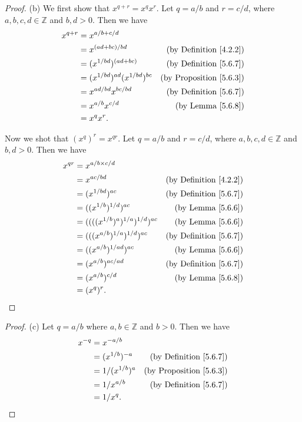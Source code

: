 \begin{proof}{(b)}
We first show that \(x^{q + r} = x^q x^r\).
Let \(q = a / b\) and \(r = c / d\), where \(a, b, c, d \in \mathds{Z}\) and \(b, d > 0\).
Then we have
\begin{align*}
x^{q + r} &= x^{a / b + c / d} \\
&= x^{(ad + bc) / bd} & \text{(by Definition \ref{4.2.2})} \\
&= (x^{1 / bd})^{(ad + bc)} & \text{(by Definition \ref{5.6.7})} \\
&= (x^{1 / bd})^{ad} (x^{1 / bd})^{bc} & \text{(by Proposition \ref{5.6.3})} \\
&= x^{ad / bd} x^{bc / bd} & \text{(by  Definition \ref{5.6.7})} \\
&= x^{a / b} x^{c / d} & \text{(by Lemma \ref{5.6.8})} \\
&= x^q x^r.
\end{align*}

Now we shot that \((x^q)^r = x^{qr}\).
Let \(q = a / b\) and \(r = c / d\), where \(a, b, c, d \in \mathds{Z}\) and \(b, d > 0\).
Then we have
\begin{align*}
x^{qr} &= x^{a / b \times c / d} \\
&= x^{ac / bd} & \text{(by Definition \ref{4.2.2})} \\
&= (x^{1 / bd})^{ac} & \text{(by Definition \ref{5.6.7})} \\
&= ((x^{1 / b})^{1 / d})^{ac} & \text{(by Lemma \ref{5.6.6})} \\
&= ((((x^{1 / b})^a)^{1 / a})^{1 / d})^{ac} & \text{(by Lemma \ref{5.6.6})} \\
&= (((x^{a / b})^{1 / a})^{1 / d})^{ac} & \text{(by Definition \ref{5.6.7})} \\
&= ((x^{a / b})^{1 / ad})^{ac} & \text{(by Lemma \ref{5.6.6})} \\
&= (x^{a / b})^{ac / ad} & \text{(by Definition \ref{5.6.7})} \\
&= (x^{a / b})^{c / d} & \text{(by Lemma \ref{5.6.8})} \\
&= (x^q)^r.
\end{align*}
\end{proof}

\begin{proof}{(c)}
Let \(q = a / b\) where \(a, b \in \mathds{Z}\) and \(b > 0\).
Then we have
\begin{align*}
x^{-q} &= x^{-a / b} \\
&= (x^{1 / b})^{-a} & \text{(by Definition \ref{5.6.7})} \\
&= 1 / (x^{1 / b})^a & \text{(by Proposition \ref{5.6.3})} \\
&= 1 / x^{a / b} & \text{(by Definition \ref{5.6.7})} \\
&= 1 / x^q.
\end{align*}
\end{proof}

